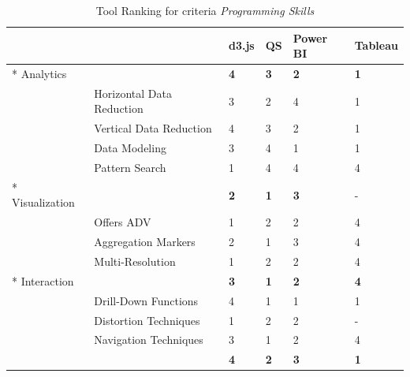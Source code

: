 \par
\begin{table}[H]

    \begin{tabular}{|l| l l l l l|}
        \hline
        \multicolumn{2}{|c}{}   & d3.js  & \gls{QS}    & Power BI & Tableau\\\hline
        \rowcolor{gray!30}\multirow{5}*{\cellcolor{white} Analytics}
        &  & \textbf{4} & \textbf{3} & \textbf{2} & \textbf{1}\\\cline{2-6}
        & Horizontal Data Reduction     & 3 & 2 & 4 & 1\\
        & Vertical Data Reduction       & 4 & 3 & 2 & 1\\
        & Data Modeling                 & 3 & 4 & 1 & 1\\
        & Pattern Search                & 1 & 4 & 4 & 4\\
        \hline
        \rowcolor{gray!30}\multirow{3}*{\cellcolor{white} Visualization}
        &  & \textbf{2}    & \textbf{1} & \textbf{3} & -\\\cline{2-6}
        & Offers ADV            & 1 & 2 & 2 & 4 \\
        & Aggregation Markers   & 2 & 1 & 3 & 4 \\
        & Multi-Resolution      & 1 & 2 & 2 & 4  \\
        
        \hline
        \rowcolor{gray!30}\multirow{3}*{\cellcolor{white} Interaction}
         &  & \textbf{3}    & \textbf{1} & \textbf{2} & \textbf{4}\\\cline{2-6}
        & Drill-Down Functions  & 4 & 1 & 1 & 1    \\
        & Distortion Techniques & 1 & 2 & 2 & -    \\        
        & Navigation Techniques & 3 & 1 & 2 & 4    \\
        \hline
        \hline
        \multicolumn{2}{|c}{}   & \textbf{4}    & \textbf{2}  & \textbf{3} & \textbf{1}\\
        \hline
    \end{tabular}
    \caption[Tool Ranking for Programming Skills]{Tool Ranking for criteria \textit{Programming Skills}}
    \label{table:rankingPS}
    \end{table}

